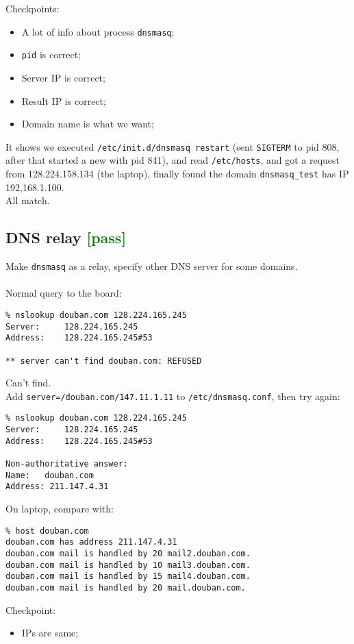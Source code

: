 \documentclass[a4paper]{report}
\begin{document}
Checkpoints:
\begin{itemize}
    \item A lot of info about process {\tt dnsmasq};
    \item {\tt pid} is correct;
    \item Server IP is correct;
    \item Result IP is correct;
    \item Domain name is what we want;
\end{itemize}
It shows we executed {\tt /etc/init.d/dnsmasq restart} (sent {\tt SIGTERM} to pid 808, 
after that started a new with pid 841), and read {\tt /etc/hosts}, and got a request from
128.224.158.134 (the laptop), finally found the domain {\tt dnsmasq\_test} 
has IP 192,168.1.100.\\
All match.
\subsection{DNS relay \textcolor{green}{[pass]}}
Make {\tt dnsmasq} as a relay, specify other DNS server for some domains.\\\\
Normal query to the board:
\begin{lstlisting}
% nslookup douban.com 128.224.165.245
Server:		128.224.165.245
Address:	128.224.165.245#53

** server can't find douban.com: REFUSED
\end{lstlisting}
Can't find.\\
Add {\tt server=/douban.com/147.11.1.11} to {\tt /etc/dnsmasq.conf}, then try again:
\begin{lstlisting}
% nslookup douban.com 128.224.165.245
Server:		128.224.165.245
Address:	128.224.165.245#53

Non-authoritative answer:
Name:	douban.com
Address: 211.147.4.31
\end{lstlisting}
On laptop, compare with:
\begin{lstlisting}
% host douban.com
douban.com has address 211.147.4.31
douban.com mail is handled by 20 mail2.douban.com.
douban.com mail is handled by 10 mail3.douban.com.
douban.com mail is handled by 15 mail4.douban.com.
douban.com mail is handled by 20 mail.douban.com.
\end{lstlisting}
Checkpoint:
\begin{itemize}
    \item IPs are same;
\end{itemize}
\end{document}
